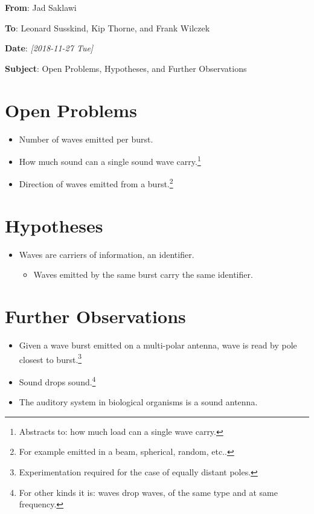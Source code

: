 \documentclass[11pt]{article}
\author{Jad Saklawi}
\date{\today}
\title{}
\begin{document}
\begin{flushleft}
\textbf{From}: Jad Saklawi \par
\textbf{To}: Leonard Susskind, Kip Thorne, and Frank Wilczek \par
\textbf{Date}: \textit{[2018-11-27 Tue]} \par
\textbf{Subject}: Open Problems, Hypotheses, and Further Observations\\
\end{flushleft}

\section{Open Problems}
\label{sec:org3c79ba0}
\begin{itemize}
\item Number of waves emitted per burst.
\item How much sound can a single sound wave carry.\footnote{Abstracts to: how much load can a single wave carry.}
\item Direction of waves emitted from a burst.\footnote{For example emitted in a beam, spherical, random, etc..}
\end{itemize}
\section{Hypotheses}
\label{sec:org9d272b4}
\begin{itemize}
\item Waves are carriers of information, an identifier.
\begin{itemize}
\item Waves emitted by the same burst carry the same identifier.
\end{itemize}
\end{itemize}
\section{Further Observations}
\label{sec:orgd2892af}
\begin{itemize}
\item Given a wave burst emitted on a multi-polar antenna, wave is read
by pole closest to burst.\footnote{Experimentation required for the case of equally
distant poles.}
\item Sound drops sound.\footnote{For other kinds it is: waves drop waves, of the same type and at same frequency.}
\item The auditory system in biological organisms is a sound antenna.
\end{itemize}
\end{document}
